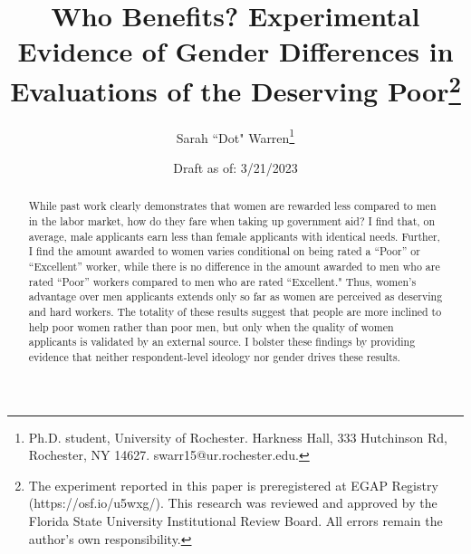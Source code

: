 \documentclass[12pt]{article}%
\author{Sarah ``Dot" Warren\thanks{Ph.D. student, University of Rochester. Harkness Hall, 333 Hutchinson Rd, Rochester, NY 14627. swarr15@ur.rochester.edu.}}
\title{Who Benefits? Experimental Evidence of Gender Differences in Evaluations of the Deserving Poor\thanks{The experiment reported in this paper is preregistered at EGAP Registry (https://osf.io/u5wxg/). This research was reviewed and approved by the Florida State University Institutional Review Board. All errors remain the author's own responsibility.}}
\date{Draft as of: 3/21/2023}
\begin{document}
\maketitle
\thispagestyle{empty}


\begin{abstract}
While past work clearly demonstrates that women are rewarded less compared to men in the labor market, how do they fare when taking up government aid? I find that, on average, male applicants earn less than female applicants with identical needs. Further, I find the amount awarded to women varies conditional on being rated a ``Poor” or ``Excellent” worker, while there is no difference in the amount awarded to men who are rated ``Poor” workers compared to men who are rated ``Excellent." Thus, women’s advantage over men applicants extends only so far as women are perceived as deserving and hard workers. The totality of these results suggest that people are more inclined to help poor women rather than poor men, but only when the quality of women applicants is validated by an external source. I bolster these findings by providing evidence that neither respondent-level ideology nor gender drives these results.


\end{abstract}


\newpage
\end{document}
